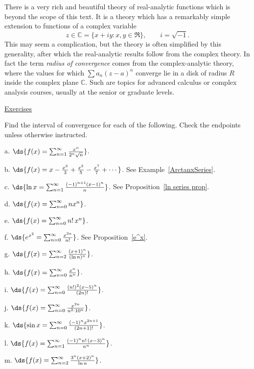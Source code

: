 There is a very rich and beautiful theory of real-analytic functions
which is beyond the scope of this text.  It is a theory which 
has a remarkably simple extension to functions 
of a complex variable
$$z\in\mathbb{C}=\{x+iy: x,y\in\Re\},\qquad i=\sqrt{-1}.$$
This may seem a complication, but the theory is often simplified
by this generality, after which the real-analytic results follow
from the complex theory.  In fact the term {\it radius of convergence}
comes from the complex-analytic theory, where the values 
for which $\sum a_n(z-a)^n$ converge lie in a disk of
radius $R$ inside the complex plane $\mathbb{C}$.
Such are topics for advanced calculus
or complex analysis courses, usually at the senior or graduate 
levels.

\newpage
\begin{center}{\Large\underline{Exercises}}\end{center}
\bigskip
\bhw Find the interval of convergence for each of the 
following.  Check the endpoints unless otherwise instructed. 
\begin{description}
\item a. $\ds{f(x)=\sum_{n=1}^\infty\frac{x^n}{2^n\sqrt{n}}}$.   
\item b. $\ds{f(x)=x-\frac{x^3}3+\frac{x^5}5-\frac{x^7}7+\cdots}$.
 See Example~\ref{ArctanxSeries}.
\item c. $\ds{\ln x=\sum_{n=1}^\infty\frac{(-1)^{n+1}(x-1)^n}{n}}$.
See Proposition~\ref{ln series prop}. 
\item d. $\ds{f(x)=\sum_{n=0}^\infty nx^n}$.
\item e. $\ds{f(x)=\sum_{n=0}^\infty n!\,x^n}$.
\item f. $\ds{e^{x^2}=\sum_{n=0}^\infty\frac{x^{2n}}{n!}}$.
	See Proposition~\ref{e^x}.
\item g. $\ds{f(x)=\sum_{n=2}^\infty\frac{(x+1)^n}{(\ln n)^n}}$. 
\item h. $\ds{f(x)=\sum_{n=0}^\infty \frac{x^n}{n^n}}$.
\item i. $\ds{f(x)=\sum_{n=0}^\infty \frac{(n!)^2(x-5)^n}{(2n)!}}$. 
\item j. $\ds{f(x)=\sum_{n=0}^\infty\frac{x^{2n}}{n^2\cdot10^n}}$.
\item k. $\ds{\sin x=\sum_{n=0}^\infty\frac{(-1)^nx^{2n+1}}{(2n+1)!}}$. 
\item l. $\ds{f(x)=\sum_{n=1}^\infty\frac{(-1)^nn!\,(x-3)^n}{n^n}}$.
\item m. $\ds{f(x)=\sum_{n=2}^\infty\frac{3^n(x+2)^n}{\ln n}}$.
\end{description}
\label{basic int of conv exercises}\ehw






